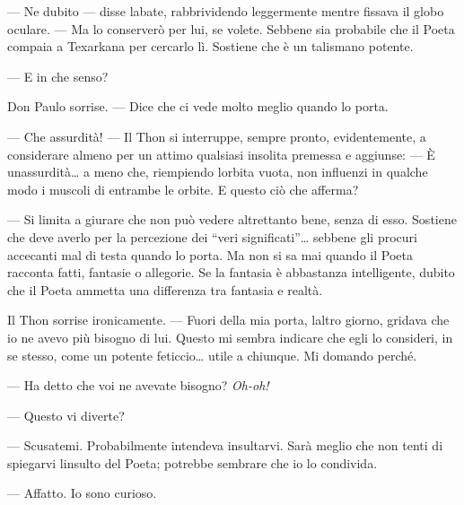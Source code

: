 --- Ne dubito --- disse l\textquotesingle abate, rabbrividendo
leggermente mentre fissava il globo oculare. --- Ma lo conserverò per
lui, se volete. Sebbene sia probabile che il Poeta compaia a Texarkana
per cercarlo lì. Sostiene che è un talismano potente.

--- E in che senso?

Don Paulo sorrise. --- Dice che ci vede molto meglio quando lo porta.

--- Che assurdità! --- Il Thon si interruppe, sempre pronto,
evidentemente, a considerare almeno per un attimo qualsiasi insolita
premessa e aggiunse: --- È un\textquotesingle assurdità\ldots{} a meno
che, riempiendo l\textquotesingle orbita vuota, non influenzi in qualche
modo i muscoli di entrambe le orbite. E questo ciò che afferma?

--- Si limita a giurare che non può vedere altrettanto bene, senza di
esso. Sostiene che deve averlo per la percezione dei ``veri
significati''\ldots{} sebbene gli procuri accecanti mal di testa quando
lo porta. Ma non si sa mai quando il Poeta racconta fatti, fantasie o
allegorie. Se la fantasia è abbastanza intelligente, dubito che il Poeta
ammetta una differenza tra fantasia e realtà.

Il Thon sorrise ironicamente. --- Fuori della mia porta,
l\textquotesingle altro giorno, gridava che io ne avevo più bisogno di
lui. Questo mi sembra indicare che egli lo consideri, in se stesso, come
un potente feticcio\ldots{} utile a chiunque. Mi domando perché.

--- Ha detto che voi ne avevate bisogno? \emph{Oh-oh!}

--- Questo vi diverte?

--- Scusatemi. Probabilmente intendeva insultarvi. Sarà meglio che non
tenti di spiegarvi l\textquotesingle insulto del Poeta; potrebbe
sembrare che io lo condivida.

--- Affatto. Io sono curioso.


